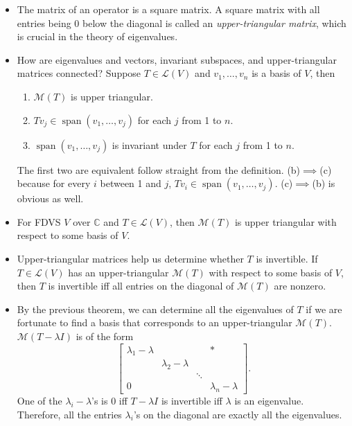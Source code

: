 \documentclass{article}
\newcommand{\C}{\mathbb{C}}
\newcommand{\s}{\operatorname{span}}
\newcommand{\LV}{\mathcal{L}(V)}
\newcommand{\M}{\mathcal{M}}
\begin{document}
\begin{itemize}
    \item The matrix of an operator is a square matrix. A square matrix with all entries being 0 below the diagonal is called an \textit{upper-triangular matrix}, which is crucial in the theory of eigenvalues.
    \item How are eigenvalues and vectors, invariant subspaces, and upper-triangular matrices connected? Suppose $T \in \LV$ and $v_1,\dots,v_n$ is a basis of $V$, then
    \begin{enumerate}[label=(\alph*)]
        \item $\M(T)$ is upper triangular.
        \item $Tv_j \in \s(v_1,\dots,v_j)$ for each $j$ from 1 to $n$.
        \item $\s(v_1,\dots,v_j)$ is invariant under $T$ for each $j$ from 1 to $n$.
    \end{enumerate}
    The first two are equivalent follow straight from the definition. (b)$\implies$(c) because for every $i$ between 1 and $j$, $Tv_i \in \s(v_1,\dots,v_j)$. (c)$\implies$(b) is obvious as well.
    \item For FDVS $V$ over $\C$ and $T \in \LV$, then $\M(T)$ is upper triangular with respect to some basis of $V$.
    
    \item Upper-triangular matrices help us determine whether $T$ is invertible. If $T \in \LV$ has an upper-triangular $\M(T)$ with respect to some basis of $V$, then $T$ is invertible iff all entries on the diagonal of $\M(T)$ are nonzero.
    
    \item By the previous theorem, we can determine all the eigenvalues of $T$ if we are fortunate to find a basis that corresponds to an upper-triangular $\M(T)$. $\M(T - \lambda I)$ is of the form
    \begin{equation*}
        \begin{bmatrix}
        \lambda_1 - \lambda & & & \ast \\
         & \lambda_2 - \lambda & & \\
         & & \ddots & \\
         0 & & & \lambda_n - \lambda
    \end{bmatrix}.
    \end{equation*}
    One of the $\lambda_i - \lambda$'s is 0 iff $T - \lambda I$ is invertible iff $\lambda$ is an eigenvalue. Therefore, all the entries $\lambda_i$'s on the diagonal are exactly all the eigenvalues.
\end{itemize}
\end{document}
